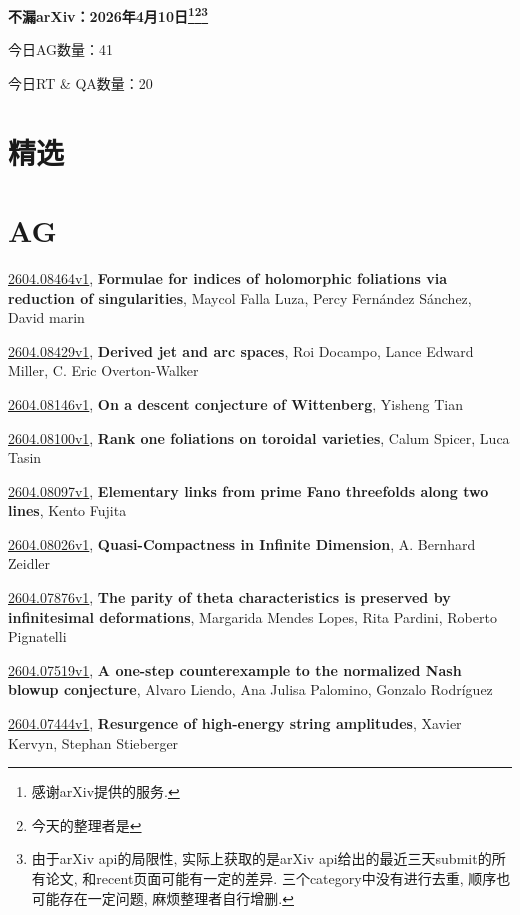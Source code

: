 \documentclass[9pt, a4paper]{article}
\theoremstyle{plain}
\theoremstyle{definition}
\theoremstyle{remark}
\newcommand{\arxiv}[3]{\href{https://arxiv.org/abs/#1}{#1}, \textbf{\textcolor{arxivblue}{#2}}, #3}
\newcommand{\AGnumber}{41}
\newcommand{\RTQAnumber}{20}
\newcommand{\NewestDate}{2026年4月10日}
\newcommand{\todayarXiver}{} %
\begin{document}
\begin{center}
    \Huge\textbf{不漏arXiv：\NewestDate\footnote{感谢arXiv提供的服务.}\footnote{今天的整理者是\todayarXiver}\footnote{由于arXiv api的局限性, 实际上获取的是arXiv api给出的最近三天submit的所有论文, 和recent页面可能有一定的差异. 三个category中没有进行去重, 顺序也可能存在一定问题, 麻烦整理者自行增删.}} \\
\end{center}

\setcounter{section}{-1}

\begin{center}
    今日AG数量：\AGnumber
    
    今日RT \& QA数量：\RTQAnumber
    
\end{center}


\section{精选}


\section{AG}
\arxiv{2604.08464v1}{Formulae for indices of holomorphic foliations via reduction of singularities}{Maycol Falla Luza, Percy Fernández Sánchez, David marin}

\arxiv{2604.08429v1}{Derived jet and arc spaces}{Roi Docampo, Lance Edward Miller, C. Eric Overton-Walker}

\arxiv{2604.08146v1}{On a descent conjecture of Wittenberg}{Yisheng Tian}

\arxiv{2604.08100v1}{Rank one foliations on toroidal varieties}{Calum Spicer, Luca Tasin}

\arxiv{2604.08097v1}{Elementary links from prime Fano threefolds along two lines}{Kento Fujita}

\arxiv{2604.08026v1}{Quasi-Compactness in Infinite Dimension}{A. Bernhard Zeidler}

\arxiv{2604.07876v1}{The parity of theta characteristics is preserved by infinitesimal deformations}{Margarida Mendes Lopes, Rita Pardini, Roberto Pignatelli}

\arxiv{2604.07519v1}{A one-step counterexample to the normalized Nash blowup conjecture}{Alvaro Liendo, Ana Julisa Palomino, Gonzalo Rodríguez}

\arxiv{2604.07444v1}{Resurgence of high-energy string amplitudes}{Xavier Kervyn, Stephan Stieberger}
\end{document}
